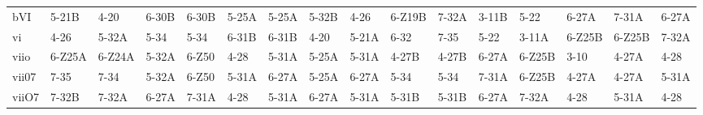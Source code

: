 \documentclass{article}
\begin{document}
\begin{table}
\begin{center}
\begin{tabular}{llllllllllllllll}
 bVI    &  5-21B   &  4-20    &  6-30B   &  6-30B   &  5-25A   &  5-25A   &  5-32B  &  4-26   &  6-Z19B  &  7-32A   &  3-11B   &  5-22    &  6-27A   &  7-31A   &  6-27A  \\
 vi     &  4-26    &  5-32A   &  5-34    &  5-34    &  6-31B   &  6-31B   &  4-20   &  5-21A  &  6-32    &  7-35    &  5-22    &  3-11A   &  6-Z25B  &  6-Z25B  &  7-32A  \\
 viio   &  6-Z25A  &  6-Z24A  &  5-32A   &  6-Z50   &  4-28    &  5-31A   &  5-25A  &  5-31A  &  4-27B   &  4-27B   &  6-27A   &  6-Z25B  &  3-10    &  4-27A   &  4-28   \\
 vii07  &  7-35    &  7-34    &  5-32A   &  6-Z50   &  5-31A   &  6-27A   &  5-25A  &  6-27A  &  5-34    &  5-34    &  7-31A   &  6-Z25B  &  4-27A   &  4-27A   &  5-31A  \\
 viiO7  &  7-32B   &  7-32A   &  6-27A   &  7-31A   &  4-28    &  5-31A   &  6-27A  &  5-31A  &  5-31B   &  5-31B   &  6-27A   &  7-32A   &  4-28    &  5-31A   &  4-28   \\
\hline
\end{tabular}
\end{center}
\end{table}

\restoregeometry
\end{document}
